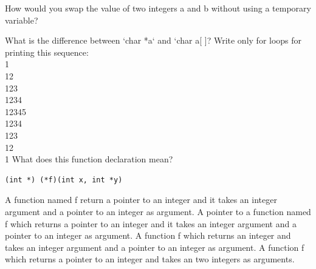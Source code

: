 \documentclass[12pt]{exam}
\begin{document}
\begin{questions}
\question[1]How would you swap the value of two integers a and b without using a temporary variable?
\makeemptybox{6em}

\question[2]What is the difference between `char *a` and `char a[ ]?
\makeemptybox{5em}
\question[2]Write only for loops for printing this sequence:\\
1\\
12\\
123\\
1234\\
12345\\
1234\\
123\\
12\\
1 
\makeemptybox{8em}
\question[2] What does this function declaration mean?
\begin{lstlisting}
(int *) (*f)(int x, int *y)

\end{lstlisting}

\begin{choices}	
\choice A function named f return a pointer to an integer and it takes an integer argument and a pointer to an integer as argument.
\choice A pointer to a function named f which returns a pointer to an integer and it takes an integer argument and a pointer to an integer as argument.
\choice A function f which returns an integer and takes an integer argument and a pointer to an integer as argument.
\choice A function f which returns a pointer to an integer and takes an two integers as arguments.
\end{choices}



\end{questions}
\end{document}
